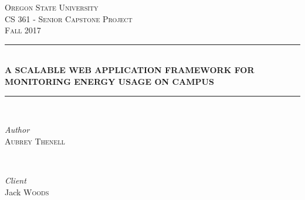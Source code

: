 \documentclass[draftclsnofoot,onecolumn,10pt]{IEEEtran}
\def\name{Aubrey Thenell}
\begin{document}
\newcommand{\HRule}{\rule{\linewidth}{0.5mm}} %
	
	\center %
	
	
	\textsc{\LARGE Oregon State University}\\[1.5cm] %
	
	\textsc{\Large CS 361 - Senior Capstone Project}\\[0.5cm] %
	
	\textsc{\large Fall 2017}\\[0.5cm] %
	
	
	\HRule\\[0.4cm]
	
	{\huge\bfseries A SCALABLE WEB APPLICATION FRAMEWORK FOR MONITORING ENERGY USAGE ON CAMPUS}\\[0.4cm] %
	
	\HRule\\[1.5cm]
	\thispagestyle{empty} %
	
	
	\begin{minipage}{0.4\textwidth}
		\begin{flushleft}
			\large
			\textit{Author}\\
			\textsc{\name} %
		\end{flushleft}
	\end{minipage}
	~
	\begin{minipage}{0.4\textwidth}
		\begin{flushright}
			\large
			\textit{Client}\\
			Jack \textsc{Woods} %
		\end{flushright}
	\end{minipage}
	
	
\end{document}
